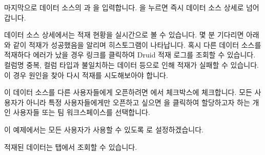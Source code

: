 \documentclass[letterpaper,10pt,english]{sphinxmanual}
\begin{document}
마지막으로 데이터 소스의 과 을 입력합니다. 을 누르면 즉시 데이터 소스 상세로 넘어갑니다.
\begin{quote}

\begin{figure}[H]
\centering

\noindent{}
\end{figure}
\end{quote}

데이터 소스 상세에서는 적재 현황을 실시간으로 볼 수 있습니다. 몇 분 기다리면 아래와 같이 적재가 성공했음을 알리며 히스토그램이 나타납니다. 혹시 다른 데이터 소스를 적재하다 에러가 났을 경우  링크를 클릭하여 Druid 적재 로그를 조회할 수 있습니다. 컬럼명 중복, 컬럼 타입과 불일치하는 데이터 등으로 인해 적재가 실패할 수 있습니다. 이 경우 원인을 찾아 다시 적재를 시도해보아야 합니다.
\begin{quote}

\begin{figure}[H]
\centering

\noindent{}
\end{figure}
\end{quote}

이 데이터 소스를 다른 사용자들에게 오픈하려면 에서  체크박스에 체크합니다. 모든 사용자가 아니라 특정 사용자들에게만 오픈하고 싶으면 을 클릭하여 할당하고자 하는 개인 사용자들 또는 팀 워크스페이스를 선택합니다.
\begin{quote}

\begin{figure}[H]
\centering

\noindent{}
\end{figure}
\end{quote}

이 예제에서는 모든 사용자가 사용할 수 있도록 로 설정하겠습니다.
\begin{quote}

\begin{figure}[H]
\centering

\noindent{}
\end{figure}
\end{quote}

적재된 데이터는  탭에서 조회할 수 있습니다.
\begin{quote}

\begin{figure}[H]
\centering

\noindent{}
\end{figure}
\end{quote}
\end{document}
